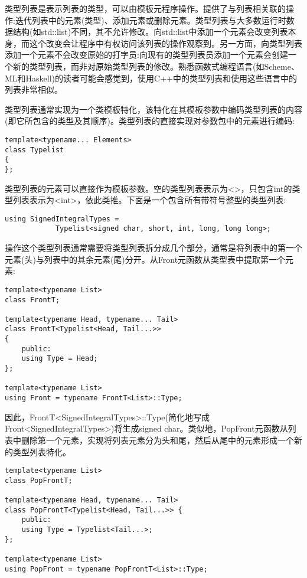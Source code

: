类型列表是表示列表的类型，可以由模板元程序操作。提供了与列表相关联的操作:迭代列表中的元素(类型)、添加元素或删除元素。类型列表与大多数运行时数据结构(如std::list)不同，其不允许修改。向std::list中添加一个元素会改变列表本身，而这个改变会让程序中有权访问该列表的操作观察到。另一方面，向类型列表添加一个元素不会改变原始的打字员:向现有的类型列表员添加一个元素会创建一个新的类型列表，而非对原始类型列表的修改。熟悉函数式编程语言(如Scheme、ML和Haskell)的读者可能会感觉到，使用C++中的类型列表和使用这些语言中的列表非常相似。

类型列表通常实现为一个类模板特化，该特化在其模板参数中编码类型列表的内容(即它所包含的类型及其顺序)。类型列表的直接实现对参数包中的元素进行编码:

\begin{lstlisting}[style=styleCXX]
template<typename... Elements>
class Typelist
{
};
\end{lstlisting}

类型列表的元素可以直接作为模板参数。空的类型列表表示为<>，只包含int的类型列表表示为<int>，依此类推。下面是一个包含所有带符号整型的类型列表:

\begin{lstlisting}[style=styleCXX]
using SignedIntegralTypes =
			Typelist<signed char, short, int, long, long long>;
\end{lstlisting}

操作这个类型列表通常需要将类型列表拆分成几个部分，通常是将列表中的第一个元素(头)与列表中的其余元素(尾)分开。从Front元函数从类型表中提取第一个元素:

\begin{lstlisting}[style=styleCXX]
template<typename List>
class FrontT;

template<typename Head, typename... Tail>
class FrontT<Typelist<Head, Tail...>>
{
	public:
	using Type = Head;
};

template<typename List>
using Front = typename FrontT<List>::Type;
\end{lstlisting}

因此，FrontT<SignedIntegralTypes>::Type(简化地写成Front<SignedIntegralTypes>)将生成signed char。类似地，PopFront元函数从列表中删除第一个元素，实现将列表元素分为头和尾，然后从尾中的元素形成一个新的类型列表特化。

\begin{lstlisting}[style=styleCXX]
template<typename List>
class PopFrontT;

template<typename Head, typename... Tail>
class PopFrontT<Typelist<Head, Tail...>> {
	public:
	using Type = Typelist<Tail...>;
};

template<typename List>
using PopFront = typename PopFrontT<List>::Type;
\end{lstlisting}

